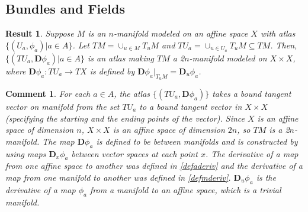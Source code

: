 \documentclass[letterpaper,12pt]{article}
\theoremstyle{plain}
\newtheorem{res}{Result}
\theoremstyle{plain}
\newtheorem*{cmnt*}{Comment}
\theoremstyle{definition}
\begin{document}
\subsection{Bundles and Fields}
\begin{res} \label{resTM}Suppose $M$ is an $n$-manifold  modeled on an affine space $X$ with atlas $\{(U_a,\phi_a)|a\in A\}$. Let $TM=\cup_{u\in M}T_uM$ and  $TU_a=\cup_{u\in U_a}T_uM \subseteq TM$. Then, $\{(TU_a,\mathbf{D}\phi_a)|a\in A\}$ is an atlas making $TM$ a 2$n$-manifold modeled on $X\times X$, where $\mathbf{D}\phi_a:TU_a\rightarrow TX$ is defined by $\mathbf{D}\phi_a|_{T_uM}=\mathbf{D}_u\phi_a$.
\end{res}

\begin{cmnt*}
For each $a\in A$, the atlas $\{(TU_a,\mathbf{D}\phi_a)\}$ takes a bound tangent vector on manifold from the set $TU_a$ to a bound tangent vector in $X\times X$ (specifying the starting and the ending points of the vector). Since $X$ is an affine space of dimension $n$, $X\times X$ is an affine space of dimension $2n$, so $TM$ is a 2$n$-manifold. The map $\mathbf{D}\phi_a$ is defined to be between manifolds and is constructed by using maps $\mathbf{D}_x\phi_a$ between vector spaces at each point $x$. The derivative of a map from one affine space to another was defined in \autoref{defaderiv} and the derivative of a map from one manifold to another was defined in \autoref{defmderiv}. $\mathbf{D}_u\phi_a$ is the derivative of a map $\phi_a$ from a manifold to an affine space, which is a trivial manifold.
\end{cmnt*}
\end{document}
